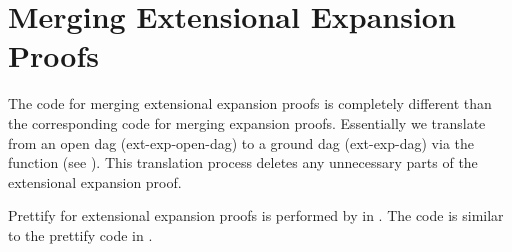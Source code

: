 % 
% 

\section{Merging Extensional Expansion Proofs}

The code for
merging extensional expansion proofs 
is completely different than the corresponding
code for merging expansion proofs.  Essentially
we translate from an open dag (ext-exp-open-dag)
to a ground dag (ext-exp-dag) via the function 
(see ).
This translation process deletes any unnecessary parts of the extensional expansion proof.

Prettify for extensional expansion proofs is performed by 
in .  The code is similar to the prettify code in .

